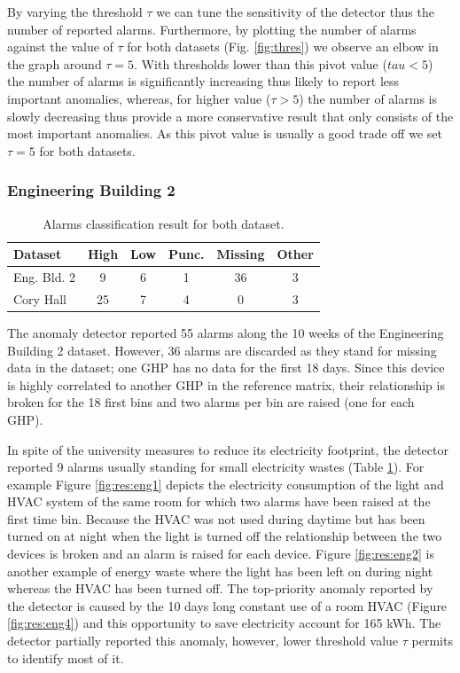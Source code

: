 By varying the threshold $\tau$ we can tune the sensitivity of the detector thus the number of reported alarms.  
Furthermore, by plotting the number of alarms against the value of $\tau$ for both datasets (Fig. \ref{fig:thres}) we observe an elbow in the graph around $\tau=5$.
With thresholds lower than this pivot value ($tau<5$) the number of alarms is significantly increasing thus likely to report less important anomalies, whereas, for higher value ($\tau>5$) the number of alarms is slowly decreasing thus provide a more conservative result that only consists of the most important anomalies.
As this pivot value is usually a good trade off we set $\tau=5$ for both datasets.


\subsubsection{Engineering Building 2}

\begin{table}
\begin{center}
\begin{tabular}{|l||c|c|c|c|c|}
\hline
Dataset&High&Low&Punc.&Missing&Other\\ \hline \hline
Eng. Bld. 2& 9 & 6 & 1 & 36 & 3 \\ \hline
Cory Hall& 25 & 7 & 4 & 0 & 3 \\ \hline
\end{tabular}
\end{center}
\caption{Alarms classification result for both dataset.}
\label{tab:classif}
\end{table}

The anomaly detector reported 55 alarms along the 10 weeks of the Engineering Building 2 dataset.
However, 36 alarms are discarded as they stand for missing data in the dataset; one GHP has no data for the first 18 days.
Since this device is highly correlated to another GHP in the reference matrix, their relationship is broken for the 18 first bins and two alarms per bin are raised (one for each GHP).

In spite of the university measures to reduce its electricity footprint, the detector reported 9 alarms usually standing for small electricity wastes (Table \ref{tab:classif}).
For example Figure \ref{fig:res:eng1} depicts the electricity consumption of the light and HVAC system of the same room for which two alarms have been raised at the first time bin.
Because the HVAC was not used during daytime but has been turned on at night when the light is turned off the relationship between the two devices is broken and an alarm is raised for each device.
Figure \ref{fig:res:eng2} is another example of energy waste where the light has been left on during night whereas the HVAC has been turned off.
The top-priority anomaly reported by the detector is caused by the 10 days long constant use of a room HVAC (Figure \ref{fig:res:eng4}) and this opportunity to save electricity account for 165 kWh.
The detector partially reported this anomaly, however, lower threshold value $\tau$ permits to identify most of it.


